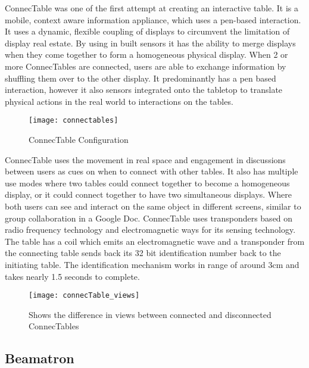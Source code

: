 ConnecTable\cite{connectables} was one of the first attempt at creating
an interactive table. It is a mobile, context aware
information appliance, which uses a pen-based interaction. It uses
a dynamic, flexible coupling of displays to circumvent the limitation
of display real estate. By using in built sensors it has the ability
to merge displays when they come together to form a homogeneous physical
display. When 2 or more ConnecTables are connected, users are able
to exchange information by shuffling them over to the other display.
It predominantly has a pen based interaction, however it also sensors
integrated onto the tabletop to translate physical actions in the
real world to interactions on the tables. 
\begin{figure}[H]
\centering
\texttt{[image: connectables]}

\protect\caption{ConnecTable Configuration}
\end{figure}
ConnecTable uses the movement in real space and engagement in discussions
between users as cues on when to connect with other tables. It also
has multiple use modes where two tables could connect together to
become a homogeneous display, or it could connect together to have
two simultaneous displays. Where both users can see and interact on
the same object in different screens, similar to group collaboration
in a Google Doc. ConnecTable uses transponders based on radio frequency
technology and electromagnetic ways for its sensing technology. The
table has a coil which emits an electromagnetic wave and a transponder
from the connecting table sends back its 32 bit identification number
back to the initiating table. The identification mechanism works in
range of around 3cm and takes nearly 1.5 seconds to complete.

\begin{figure}[h]
\centering
\texttt{[image: connecTable\_views]}
\protect\caption{Shows the difference in views between connected and disconnected ConnecTables}
\end{figure}

\subsection{Beamatron} \label{beamatron}

